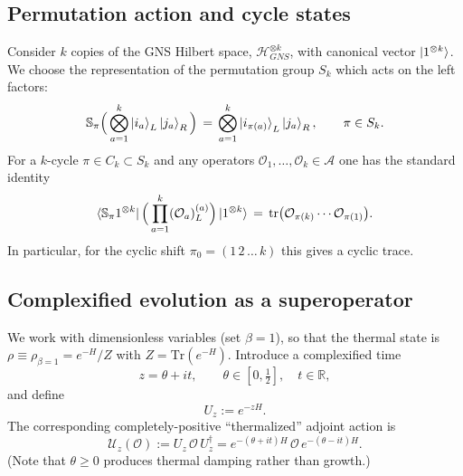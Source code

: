 \documentclass{article}
\theoremstyle{definition}
\newcommand{\mA}{\mathcal{A}}
\newcommand{\mH}{\mathcal{H}}
\newcommand{\mO}{\mathcal{O}}
\newcommand{\tr}{\text{tr}}
\begin{document}
    \subsection*{Permutation action and cycle states}

    Consider $k$ copies of the GNS Hilbert space, $\mH_{GNS}^{\otimes k}$, with
    canonical vector $\ket{1^{\otimes k}}$. We choose the representation of the permutation
    group $S_{k}$ which acts on the left factors:
    \begin{equation}
        \mathbb{S}_{\pi}\Big(\bigotimes_{a=1}^{k}\ket{i_a}_{L}\ket{j_a}_{R}\Big)
        \,=\,\bigotimes_{a=1}^{k}\ket{i_{\pi(a)}}_{L}\ket{j_a}_{R},\qquad \pi\in
        S_{k}.
    \end{equation}
    For a $k$-cycle $\pi\in C_{k}\subset S_{k}$ and any operators
    $\mO_{1},\dots, \mO_{k}\in\mA$ one has the standard identity
    \begin{equation}
        \bra{\mathbb{S}_\pi 1^{\otimes k}}\Big(\prod_{a=1}^{k}(\mO_{a})_{L}^{(a)}
        \Big)\ket{1^{\otimes k}}\,=\,\tr\big(\mO_{\pi(k)}\cdots \mO_{\pi(1)}\big)
        .
    \end{equation}
    In particular, for the cyclic shift $\pi_{0}=(1\,2\,\dots\,k)$ this gives a cyclic
    trace.

    \subsection*{Complexified evolution as a superoperator}

    We work with dimensionless variables (set $\beta=1$), so that the thermal state
    is $\rho\equiv\rho_{\beta=1}=e^{-H}/Z$ with $Z=\mathrm{Tr}(e^{-H})$.
    Introduce a complexified time
    \begin{equation}
        z=\theta+i t,\qquad \theta\in[0,\tfrac12],\quad t\in\mathbb{R},
    \end{equation}
    and define
    \begin{equation}
        U_{z}:=e^{-zH}.
    \end{equation}
    The corresponding completely-positive ``thermalized'' adjoint action is
    \begin{equation}
        \boxed{\;\mathcal{U}_{z}(\mO):=U_{z}\,\mO\,U_{z}^{\dagger} =e^{-(\theta+i t)H}\,\mO\,e^{-(\theta-i t)H}.\;}
    \end{equation}
    (Note that $\theta\ge 0$ produces thermal damping rather than growth.)
\end{document}
